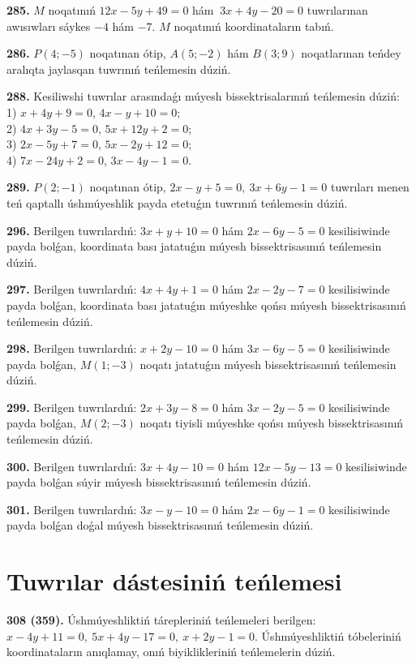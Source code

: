 \documentclass{article}
\begin{document}
\textbf{285.} $M$ noqatınıń \(12x - 5y + 49 = 0\) hám
\(\ 3x + 4y - 20 = 0\) tuwrılarınan awısıwları sáykes $-4$ hám
$-7$. $M$ noqatınıń koordinataların tabıń.

\textbf{286.} \(P(4; - 5)\) noqatınan ótip,
\(A(5; - 2)\) hám \(B(3;9)\) noqatlarınan teńdey aralıqta jaylasqan
tuwrınıń teńlemesin dúziń.

\textbf{288.} Kesiliwshi tuwrılar arasındaǵı múyesh bissektrisalarınıń
teńlemesin dúziń:\\
1) $x + 4y + 9 = 0$, $4x - y + 10 = 0$; \\
2) $4x + 3y - 5 = 0$, $5x + 12y + 2 = 0$; \\
3) $2x - 5y + 7 = 0$, $5x - 2y + 12 = 0$; \\
4) $7x - 24y + 2 = 0$, $3x - 4y - 1 = 0$.

\textbf{289.} \(P(2; - 1)\) noqatınan ótip,
\(2x - y + 5 = 0,\ 3x + 6y - 1 = 0\) tuwrıları menen teń qaptallı
úshmúyeshlik payda etetuǵın tuwrınıń teńlemesin dúziń.

\textbf{296.} Berilgen tuwrılardıń:
\(3x + y + 10 = 0\) hám \(2x - 6y - 5 = 0\) kesilisiwinde payda
bolǵan, koordinata bası jatatuǵın múyesh bissektrisasınıń teńlemesin
dúziń.

\textbf{297.} Berilgen tuwrılardıń: \(4x + 4y + 1 = 0\) hám
\(2x - 2y - 7 = 0\) kesilisiwinde payda bolǵan, koordinata bası
jatatuǵın múyeshke qońsı múyesh bissektrisasınıń teńlemesin dúziń.

\textbf{298.} Berilgen tuwrılardıń:
\(x + 2y - 10 = 0\) hám \(3x - 6y - 5 = 0\) kesilisiwinde payda
bolǵan, \(M(1; - 3)\) noqatı jatatuǵın múyesh bissektrisasınıń
teńlemesin dúziń.

\textbf{299.} Berilgen tuwrılardıń:
\(2x + 3y - 8 = 0\) hám \(3x - 2y - 5 = 0\) kesilisiwinde payda
bolǵan, \(M(2; - 3)\) noqatı tiyisli múyeshke qońsı múyesh
bissektrisasınıń teńlemesin dúziń.

\textbf{300.} Berilgen tuwrılardıń:
\(3x + 4y - 10 = 0\) hám \(12x - 5y - 13 = 0\) kesilisiwinde payda
bolǵan súyir múyesh bissektrisasınıń teńlemesin dúziń.

\textbf{301.} Berilgen tuwrılardıń: \(3x - y - 10 = 0\) hám
\(2x - 6y - 1 = 0\) kesilisiwinde payda bolǵan doǵal múyesh
bissektrisasınıń teńlemesin dúziń.

\section*{Tuwrılar dástesiniń teńlemesi}

\textbf{308 (359).} Úshmúyeshliktiń tárepleriniń teńlemeleri berilgen:
\(x - 4y + 11 = 0,\ 5x + 4y - 17 = 0,\ x + 2y - 1 = 0.\) 
Úshmúyeshliktiń tóbeleriniń koordinataların anıqlamay, onıń
biyiklikleriniń teńlemelerin dúziń.
\end{document}
